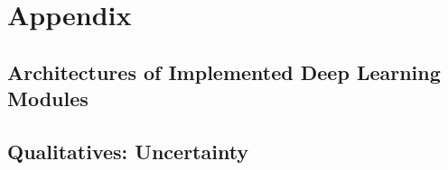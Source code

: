 \chapter{Appendix}\label{chap:appendix}


\section*{Architectures of Implemented Deep Learning Modules}

\clearpage

\clearpage

\clearpage

\clearpage

\section*{}

\section*{Qualitatives: Uncertainty}
